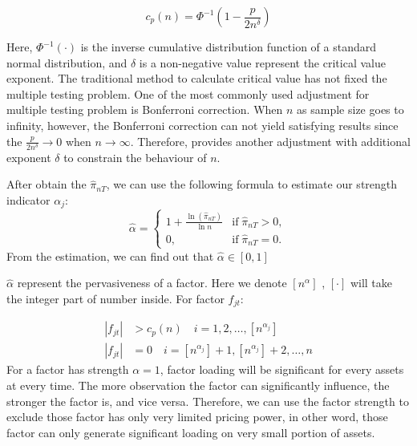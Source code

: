 \documentclass[12pt]{article}
\begin{document}
\[   c_p(n) = \Phi^{-1}(1 - \frac{p}{2n^\delta})   \tag{3} \label{critical_value_function} \]

Here, $\Phi^{-1}(\cdot)$ is the inverse cumulative distribution function of a standard normal distribution, and $\delta$ is a non-negative value represent the critical value exponent. 
The traditional method to calculate critical value has not fixed the multiple testing problem. 
One of the most commonly used adjustment for multiple testing problem is Bonferroni correction. 
When $n$ as sample size goes to infinity, however, the Bonferroni correction can not yield satisfying results since the $\frac{p}{2n^{\delta}} \to 0$ when $n \to \infty$. 
Therefore,  provides another adjustment with additional exponent $\delta$ to constrain the behaviour of $n$.

After obtain the $\hat{\pi}_{nT}$, we can use the following formula to estimate our strength indicator $\alpha_j$:
\[ \hat{\alpha} = \begin{cases}
1+\frac{\ln(\hat{\pi}_{nT})}{\ln n} & \text{if}\; \hat{\pi}_{nT} > 0,\\
0, & \text{if}\; \hat{\pi}_{nT} = 0.
\end{cases} \]
From the estimation, we can find out that $\hat{\alpha} \in [0,1]$

$\hat{\alpha}$ represent the pervasiveness of a factor. 
Here we denote $[n^{\alpha}]$ , $[\cdot]$ will take the integer part of number inside. 
For factor $f_{jt}$:

\begin{align*}
|f_{jt}| &> c_p(n)\quad i = 1, 2,  \dots, [n^{\alpha_j}]\\
|f_{jt}| &= 0 \quad i = [n^{\alpha_j}] + 1, [n^{\alpha_j}] +2 ,\dots, n
\end{align*}
For a factor has strength $\alpha = 1$,  factor loading will be significant for every assets at every time. 
The more observation the factor can significantly influence, the stronger the factor is, and vice versa.
Therefore, we can use the factor strength to exclude those factor has only very limited pricing power, in other word, those factor can only generate significant loading on very small portion of assets. 

\newpage




		
\end{document}

